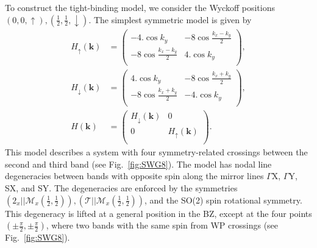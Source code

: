 \documentclass[aps,preprintnumbers,amsmath,amssymb]{revtex4-2}
\begin{document}
To construct the tight-binding model, we consider the Wyckoff positions $(0,0, \uparrow), (\tfrac{1}{2},\tfrac{1}{2},\downarrow)$. The simplest symmetric model is given by
\begin{subequations} \label{two_site_model_ham}
\begin{align}
    H_{\uparrow}(\mathbf{k}) &= 
    \left(
    \begin{array}{cc}
     -4. \cos k_y & -8 \cos \frac{k_x-k_y}{2} \\
     -8 \cos \frac{k_x-k_y}{2} & 4. \cos k_y \\
    \end{array}
    \right),\\
    H_{\downarrow}(\mathbf{k}) &= 
    \left(
    \begin{array}{cc}
     4. \cos k_y & -8 \cos \frac{k_x+k_y}{2} \\
     -8 \cos \frac{k_x+k_y}{2} & -4. \cos k_y \\
    \end{array}
    \right),\\
    H(\mathbf{k}) &= \begin{pmatrix}
        H_{\downarrow}(\mathbf{k}) &0\\
        0 & H_{\uparrow}(\mathbf{k})\\
    \end{pmatrix}. 
\end{align}
\end{subequations}
This model describes a system with four symmetry-related crossings between the second and third band (see Fig.~\ref{fig:SWG8}). 
The model has nodal line degeneracies between bands with opposite spin along the mirror lines $\Gamma$X, $\Gamma$Y, SX, and SY. The degeneracies are enforced by the symmetries $(2_x||\mathcal{M}_x(\tfrac{1}{2},\tfrac{1}{2})), (\mathcal{T}||\mathcal{M}_x(\tfrac{1}{2},\tfrac{1}{2}))$, and the SO(2) spin rotational symmetry. This degeneracy is lifted at a general position in the BZ, except at the
four points $(\pm \tfrac{\pi}{2}, \pm \tfrac{\pi}{2})$,
where two bands with the same spin from WP crossings
(see Fig.~\ref{fig:SWG8}).
\end{document}
